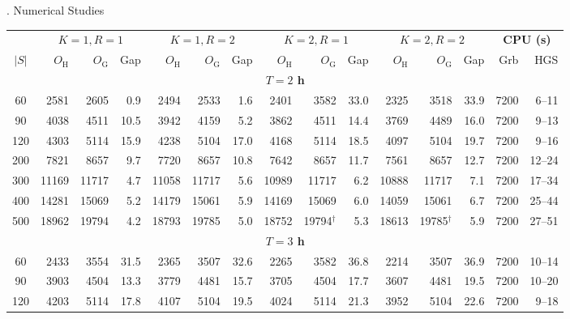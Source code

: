\begin{block}{\fontsize{46}{54}. Numerical Studies}
\begin{minipage}[t]{0.70\linewidth}
    \vspace{0.25cm}
    \renewcommand{\arraystretch}{1.25}
    \setlength{\tabcolsep}{10pt}
    {\fontsize{26}{32}\selectfont
    \begin{tabular*}{\linewidth}{@{\extracolsep{\fill}}c rrr rrr rrr rrr rr@{}}
        \toprule
        & \multicolumn{3}{c}{\boldmath$K{=}1, R{=}1$} & \multicolumn{3}{c}{\boldmath$K{=}1, R{=}2$} & \multicolumn{3}{c}{\boldmath$K{=}2, R{=}1$} & \multicolumn{3}{c}{\boldmath$K{=}2, R{=}2$} & \multicolumn{2}{c}{\textbf{CPU (s)}} \\
        \cmidrule(lr){2-4} \cmidrule(lr){5-7} \cmidrule(lr){8-10} \cmidrule(lr){11-13} \cmidrule(lr){14-15}
        $|S|$ & $O_{\text{H}}$ & $O_{\text{G}}$ & Gap & $O_{\text{H}}$ & $O_{\text{G}}$ & Gap & $O_{\text{H}}$ & $O_{\text{G}}$ & Gap & $O_{\text{H}}$ & $O_{\text{G}}$ & Gap & Grb & HGS \\
        \midrule
        \multicolumn{15}{c}{\textbf{$T=2$ h}} \\
        \midrule
        60  & 2581 & 2605 & 0.9 & 2494 & 2533 & 1.6 & 2401 & 3582 & 33.0 & 2325 & 3518 & 33.9 & 7200 & 6--11 \\
        90  & 4038 & 4511 & 10.5 & 3942 & 4159 & 5.2 & 3862 & 4511 & 14.4 & 3769 & 4489 & 16.0 & 7200 & 9--13 \\
        120 & 4303 & 5114 & 15.9 & 4238 & 5104 & 17.0 & 4168 & 5114 & 18.5 & 4097 & 5104 & 19.7 & 7200 & 9--16 \\
        200 & 7821 & 8657 & 9.7 & 7720 & 8657 & 10.8 & 7642 & 8657 & 11.7 & 7561 & 8657 & 12.7 & 7200 & 12--24 \\
        300 & 11169 & 11717 & 4.7 & 11058 & 11717 & 5.6 & 10989 & 11717 & 6.2 & 10888 & 11717 & 7.1 & 7200 & 17--34 \\
        400 & 14281 & 15069 & 5.2 & 14179 & 15061 & 5.9 & 14169 & 15069 & 6.0 & 14059 & 15061 & 6.7 & 7200 & 25--44 \\
        500 & 18962 & 19794 & 4.2 & 18793 & 19785 & 5.0 & 18752 & 19794$^\dagger$ & 5.3 & 18613 & 19785$^\dagger$ & 5.9 & 7200 & 27--51 \\
        \midrule
        \multicolumn{15}{c}{\textbf{$T=3$ h}} \\
        \midrule
        60  & 2433 & 3554 & 31.5 & 2365 & 3507 & 32.6 & 2265 & 3582 & 36.8 & 2214 & 3507 & 36.9 & 7200 & 10--14 \\
        90  & 3903 & 4504 & 13.3 & 3779 & 4481 & 15.7 & 3705 & 4504 & 17.7 & 3607 & 4481 & 19.5 & 7200 & 10--20 \\
        120 & 4203 & 5114 & 17.8 & 4107 & 5104 & 19.5 & 4024 & 5114 & 21.3 & 3952 & 5104 & 22.6 & 7200 & 9--18 \\

\end{tabular*}}
\end{minipage}
\end{block}
